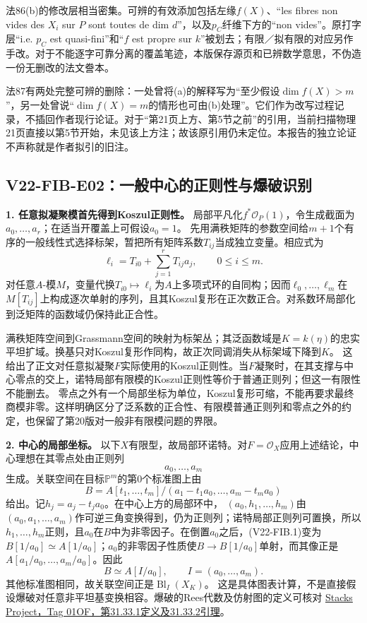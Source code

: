 \documentclass[UTF8,a4paper]{ctexbook}
\begin{document}
法86(b)的修改层相当密集。可辨的有效添加包括左缘$f(X)$、“les fibres non vides des $X_i$ sur $P$ sont toutes de dim $d$”，以及$p_C$纤维下方的“non vides”。原打字层“i.e. $p_C$ est quasi-fini”和“$f$ est propre sur $k$”被划去；有限／拟有限的对应另作手改。对于不能逐字可靠分离的覆盖笔迹，本版保存源页和已辨数学意思，不伪造一份无删改的法文誊本。

法87有两处完整可辨的删除：一处曾将(a)的解释写为“至少假设$\dim f(X)>m$”，另一处曾说“$\dim f(X)=m$的情形也可由(b)处理”。它们作为改写过程记录，不插回作者现行论证。对于“第21页上方、第5节之前”的引用，当前扫描物理21页直接以第5节开始，未见该上方注；故该原引用仍未定位。本报告的独立论证不声称就是作者拟引的旧注。

\subsection*{V22-FIB-E02：一般中心的正则性与爆破识别}

\noindent\textbf{1. 任意拟凝聚模首先得到Koszul正则性。}
局部平凡化$f^*\mathcal O_P(1)$，令生成截面为$a_0,\ldots,a_r$；在适当开覆盖上可假设$a_0=1$。
先用满秩矩阵的参数空间给$m+1$个有序的一般线性式选择标架，暂把所有矩阵系数$T_{ij}$当成独立变量。相应式为
\[
\ell_i=T_{i0}+\sum_{j=1}^rT_{ij}a_j,\qquad 0\leq i\leq m.
\]
对任意$A$-模$M$，变量代换$T_{i0}\mapsto\ell_i$为$A$上多项式环的自同构；因而$\ell_0,\ldots,\ell_m$在$M[T_{ij}]$上构成逐次单射的序列，且其Koszul复形在正次数正合。对系数环局部化到泛矩阵的函数域仍保持此正合性。

满秩矩阵空间到Grassmann空间的映射为标架丛；其泛函数域是$K=k(\eta)$的忠实平坦扩域。换基只对Koszul复形作同构，故正次同调消失从标架域下降到$K$。
这给出了正文对任意拟凝聚$F$实际使用的Koszul正则性。当$F$凝聚时，在其支撑与中心零点的交上，诺特局部有限模的Koszul正则性等价于普通正则列；但这一有限性不能删去。
零点之外有一个局部坐标为单位，Koszul复形可缩，不能再要求最终商模非零。这样明确区分了泛系数的正合性、有限模普通正则列和零点之外的约定，也保留了第20版对一般非有限模问题的界限。

\noindent\textbf{2. 中心的局部坐标。}
以下$X$有限型，故局部环诺特。对$F=\mathcal O_X$应用上述结论，中心理想在其零点处由正则列
\[
a_0,\ldots,a_m
\]
生成。关联空间在目标$\mathbb P^m$的第0个标准图上由
\[
B=A[t_1,\ldots,t_m]/(a_1-t_1a_0,\ldots,a_m-t_ma_0)
\tag{V22-FIB.1}
\]
给出。记$h_j=a_j-t_ja_0$。在中心上方的局部环中，
$(a_0,h_1,\ldots,h_m)$由$(a_0,a_1,\ldots,a_m)$作可逆三角变换得到，仍为正则列；诺特局部正则列可置换，所以$h_1,\ldots,h_m$正则，且$a_0$在$B$中为非零因子。在倒置$a_0$之后，(V22-FIB.1)变为$B[1/a_0]\simeq A[1/a_0]$；$a_0$的非零因子性质使$B\to B[1/a_0]$单射，而其像正是$A[a_1/a_0,\ldots,a_m/a_0]$。因此
\[
B\simeq A[I/a_0],\qquad I=(a_0,\ldots,a_m).
\]
其他标准图相同，故关联空间正是$\operatorname{Bl}_I(X_K)$。
这是具体图表计算，不是直接假设爆破对任意非平坦基变换相容。爆破的Rees代数及仿射图的定义可核对
\href{https://stacks.math.columbia.edu/tag/01OF}{Stacks Project，Tag 01OF，第31.33.1定义及31.33.2引理}。
\end{document}
